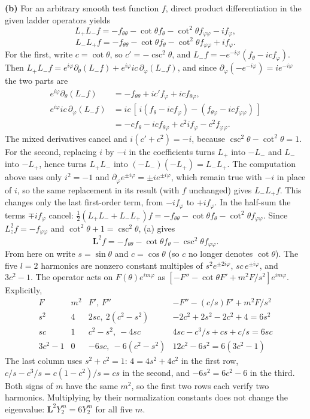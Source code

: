 \textbf{(b)} For an arbitrary smooth test function $f$, direct
product differentiation in the given ladder operators yields
\[
L_+L_-f=-f_{\theta\theta}-\cot\theta f_\theta
-\cot^2\theta f_{\varphi\varphi}-if_\varphi,
\]
\[
L_-L_+f=-f_{\theta\theta}-\cot\theta f_\theta
-\cot^2\theta f_{\varphi\varphi}+if_\varphi.
\]
For the first, write $c=\cot\theta$, so $c'=-\csc^2\theta$, and
$L_-f=-e^{-i\varphi}(f_\theta-icf_\varphi)$. Then
$L_+L_-f=e^{i\varphi}\partial_\theta(L_-f)
+e^{i\varphi}ic\,\partial_\varphi(L_-f)$, and since
$\partial_\varphi(-e^{-i\varphi})=ie^{-i\varphi}$ the two parts are
\[
\begin{aligned}
e^{i\varphi}\partial_\theta(L_-f)
&=-f_{\theta\theta}+ic'f_\varphi+ic f_{\theta\varphi},\\
e^{i\varphi}ic\,\partial_\varphi(L_-f)
&=ic\,[\,i(f_\theta-icf_\varphi)-(f_{\theta\varphi}-icf_{\varphi\varphi})\,]\\
&=-c f_\theta-ic f_{\theta\varphi}
+c^2if_\varphi-c^2f_{\varphi\varphi}.
\end{aligned}
\]
The mixed derivatives cancel and $i(c'+c^2)=-i$, because
$\csc^2\theta-\cot^2\theta=1$.
For the second, replacing $i$ by $-i$ in the coefficients turns
$L_+$ into $-L_-$ and $L_-$ into $-L_+$, hence turns $L_+L_-$ into
$(-L_-)(-L_+)=L_-L_+$. The computation above uses only $i^2=-1$ and
$\partial_\varphi e^{\pm i\varphi}=\pm ie^{\pm i\varphi}$, which remain
true with $-i$ in place of $i$, so the same replacement in its result
(with $f$ unchanged) gives $L_-L_+f$. This changes only the last
first-order term, from $-if_\varphi$ to $+if_\varphi$.
 In the half-sum the terms $\mp if_\varphi$
cancel:
$\tfrac12(L_+L_-+L_-L_+)f=-f_{\theta\theta}-\cot\theta f_\theta
-\cot^2\theta f_{\varphi\varphi}$.
Since $L_z^2f=-f_{\varphi\varphi}$ and $\cot^2\theta+1=\csc^2\theta$,
(a) gives
\[
\mathbf L^2f=-f_{\theta\theta}-\cot\theta f_\theta
-\csc^2\theta f_{\varphi\varphi}.
\]
From here on write $s=\sin\theta$ and $c=\cos\theta$ (so $c$ no
longer denotes $\cot\theta$). The five $l=2$ harmonics are
nonzero constant multiples of
$s^2e^{\pm2i\varphi}$, $sc\,e^{\pm i\varphi}$, and $3c^2-1$.
The operator acts on $F(\theta)e^{im\varphi}$ as
$[-F''-\cot\theta F'+m^2F/s^2]e^{im\varphi}$. Explicitly,
\[
\begin{array}{c|c|c|c}
F&m^2&F',\,F''&-F''-(c/s)F'+m^2F/s^2\\ \hline
s^2&4&2sc,\ 2(c^2-s^2)&-2c^2+2s^2-2c^2+4=6s^2\\
sc&1&c^2-s^2,\ -4sc&4sc-c^3/s+cs+c/s=6sc\\
3c^2-1&0&-6sc,\ -6(c^2-s^2)&12c^2-6s^2=6(3c^2-1)
\end{array}
\]
The last column uses $s^2+c^2=1$: $4=4s^2+4c^2$ in the first row,
$c/s-c^3/s=c(1-c^2)/s=cs$ in the second, and $-6s^2=6c^2-6$ in the
third. Both signs of $m$ have the same $m^2$, so the first two rows each
verify two harmonics. Multiplying by their normalization constants
does not change the eigenvalue:
$\boxed{\mathbf L^2Y_2^m=6Y_2^m}$ for all five $m$.


